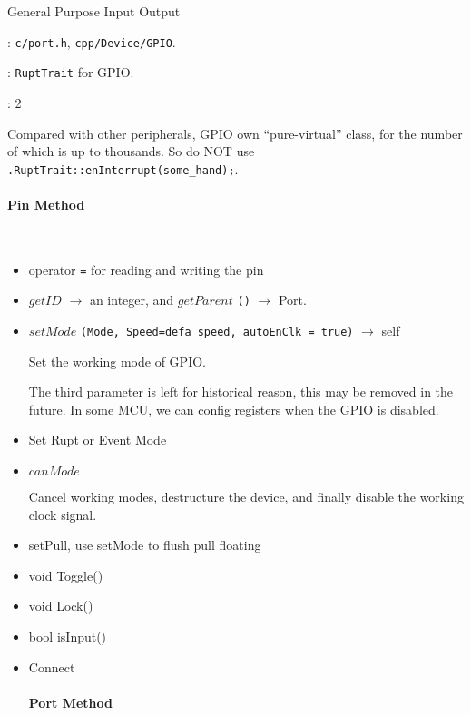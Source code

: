 
General Purpose Input Output

: \verb`c/port.h`, \verb`cpp/Device/GPIO`.

: \verb`RuptTrait` for GPIO.

: 2

Compared with other peripherals, GPIO own ``pure-virtual'' class, for the number of which is up to thousands.
So do NOT use \verb`.RuptTrait::enInterrupt(some_hand);`.

\paragraph{Pin Method} \

\begin{itemize}
\item operator \verb`=` for reading and writing the pin

\item $getID$ $\rightarrow$ an integer, and $getParent$ \verb`()` $\rightarrow$ {Port}.

\item $setMode$ \verb`(Mode, Speed=defa_speed, autoEnClk = true)` $\rightarrow$ self

Set the working mode of GPIO.

The third parameter is left for historical reason, this may be removed in the future. In some MCU, we can config registers when the GPIO is disabled. %

\item Set Rupt or Event Mode

\item $canMode$

Cancel working modes, destructure the device, and finally disable the working clock signal.

\item setPull, use setMode to flush pull floating

\item void Toggle()

\item void Lock()

\item bool isInput()

\item Connect %

\paragraph{Port Method} \


\end{itemize}
